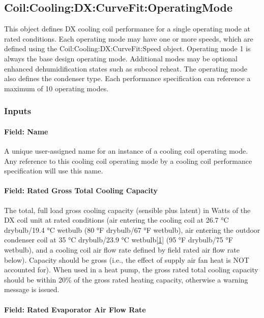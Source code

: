 \subsection{Coil:Cooling:DX:CurveFit:OperatingMode}\label{coilcoolingdxcurvefitoperatingmode}

This object defines DX cooling coil performance for a single operating mode at rated conditions. Each operating mode may have one or more speeds, which are defined using the Coil:Cooling:DX:CurveFit:Speed object. Operating mode 1 is always the base design operating mode. Additional modes may be optional enhanced dehumidification states such as subcool reheat. The operating mode also defines the condenser type. Each performance specification can reference a maximum of 10 operating modes.

\subsubsection{Inputs}\label{inputs-03}

\paragraph{Field: Name}\label{field-name-03}

A unique user-assigned name for an instance of a cooling coil operating mode. Any reference to this cooling coil operating mode by a cooling coil performance specification will use this name.

\paragraph{Field: Rated Gross Total Cooling Capacity}\label{field-rated-gross-total-cooling-capacity-1}

The total, full load gross cooling capacity (sensible plus latent) in Watts of the DX coil unit at rated conditions (air entering the cooling coil at 26.7 °C drybulb/19.4 °C wetbulb (80 °F drybulb/67 °F wetbulb), air entering the outdoor condenser coil at 35 °C drybulb/23.9 °C wetbulb\protect\hyperlink{ux5fftn1}{{[}1{]}} (95 °F drybulb/75 °F wetbulb), and a cooling coil air flow rate defined by field rated air flow rate below). Capacity should be gross (i.e., the effect of supply air fan heat is NOT accounted for). When used in a heat pump, the gross rated total cooling capacity should be within 20\% of the gross rated heating capacity, otherwise a warning message is issued.

\paragraph{Field: Rated Evaporator Air Flow Rate}\label{field-rated-evaporator-air-flow-rate-2}

